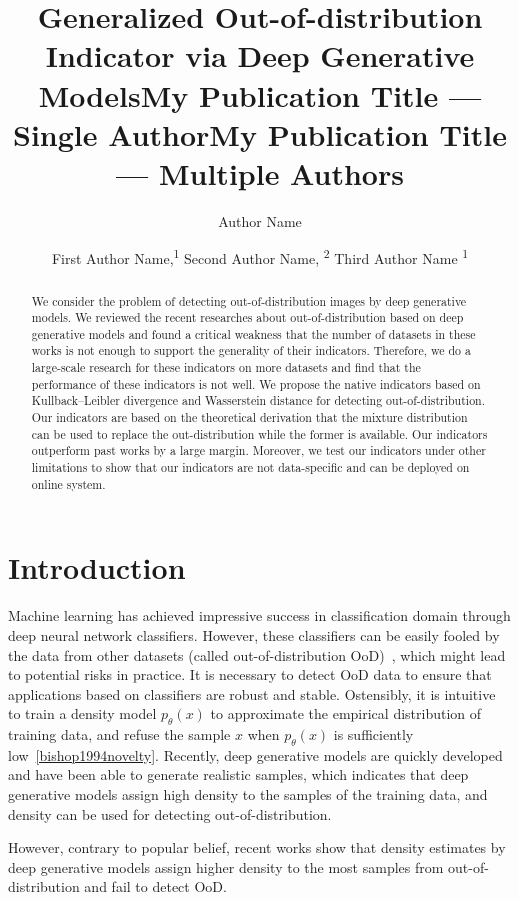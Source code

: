 \documentclass[letterpaper]{article} %
\title{Generalized Out-of-distribution Indicator via Deep Generative Models}
\author{
}
\title{My Publication Title --- Single Author}
\author {
    Author Name \\
}
\title{My Publication Title --- Multiple Authors}
\author {

        First Author Name,\textsuperscript{\rm 1}
        Second Author Name, \textsuperscript{\rm 2}
        Third Author Name \textsuperscript{\rm 1} \\
}
\begin{document}
\maketitle

\begin{abstract}

We consider the problem of detecting out-of-distribution images by deep generative models. We reviewed the recent researches about out-of-distribution based on deep generative models and found a critical weakness that the number of datasets in these works is not enough to support the generality of their indicators. 
Therefore, we do a large-scale research for these indicators on more datasets and find that the performance of these indicators is not well. 
We propose the native indicators based on Kullback–Leibler divergence and Wasserstein distance for detecting out-of-distribution. 
Our indicators are based on the theoretical derivation that the mixture distribution can be used to replace the out-distribution while the former is available. Our indicators outperform past works by a large margin. Moreover, we test our indicators under other limitations to show that our indicators are not data-specific and can be deployed on online system. 
 
\end{abstract}

\section{Introduction}
Machine learning has achieved impressive success in classification domain through deep neural network classifiers. However, these classifiers can be easily fooled by the data from other datasets (called out-of-distribution OoD)~\cite{nguyen2015deep}, which might lead to potential risks in practice. It is necessary to detect OoD data to ensure that applications based on classifiers are robust and stable. Ostensibly, it is intuitive to train a density model $p_\theta(x)$ to approximate the empirical distribution of training data, and refuse the sample $x$ when $p_\theta(x)$ is sufficiently low~\cref{bishop1994novelty}. 
Recently, deep generative models are quickly developed and have been able to generate realistic samples, which indicates that deep generative models assign high density to the samples of the training data, and density can be used for detecting out-of-distribution. 

However, contrary to popular belief, recent works show that density estimates by deep generative models assign higher density to the most samples from out-of-distribution and fail to detect OoD. 
\end{document}
